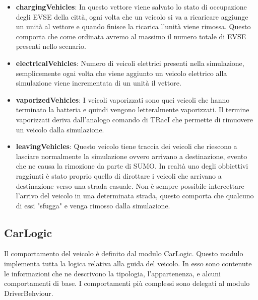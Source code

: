 \begin{itemize}
	\item \textbf{chargingVehicles}: In questo vettore viene salvato lo stato di occupazione degli EVSE della città, ogni volta che un veicolo si va a ricaricare aggiunge un unità al vettore e quando finisce la ricarica l'unità viene rimossa. Questo comporta che come ordinata avremo al massimo il numero totale di EVSE presenti nello scenario.
	\item \textbf{electricalVehicles}: Numero di veicoli elettrici presenti nella simulazione, semplicemente ogni volta che viene aggiunto un veicolo elettrico alla simulazione viene incrementata di un unità il vettore.
	\item \textbf{vaporizedVehicles}: I veicoli vaporizzati sono quei veicoli che hanno terminato la batteria e quindi vengono letteralmente vaporizzati. Il termine vaporizzati deriva dall'analogo comando di TRacI che permette di rimuovere un veicolo dalla simulazione. 
	\item \textbf{leavingVehicles}: Questo veicolo tiene traccia dei veicoli che riescono a lasciare normalmente la simulazione ovvero arrivano a destinazione, evento che ne causa la rimozione da parte di SUMO. In realtà uno degli obbiettivi raggiunti è stato proprio quello di dirottare i veicoli che arrivano a destinazione verso una strada casuale. Non è sempre possibile intercettare l'arrivo del veicolo in una determinata strada, questo comporta che qualcuno di essi "sfugga" e venga rimosso dalla simulazione.
\end{itemize}


\subsection{CarLogic}

Il comportamento del veicolo è definito dal modulo CarLogic. Questo modulo implementa tutta la logica relativa alla guida del veicolo. In esso sono contenute le informazioni che ne descrivono la tipologia, l'appartenenza, e alcuni comportamenti di base. I comportamenti più complessi sono delegati al modulo DriverBehviour.

